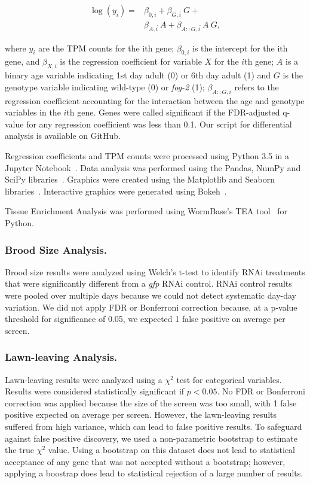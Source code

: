 \documentclass[10pt,letterpaper,twocolumn]{article}
\newcommand{\fog}{\emph{\mbox{fog-2}}}
\begin{document}
\begin{align*}
  \log(y_i) =& \beta_{0,i} + \beta_{G,i}\dot~G + \\
  &\beta_{A,i}\dot~A + \beta_{A::G,i}\dot~A~G,
  \label{eqn:GLM}
\end{align*}

where $y_i$ are the TPM counts for the ith gene; $\beta_{0,i}$ is the intercept for the ith gene, and $\beta_{X,i}$ is the regression coefficient for variable $X$ for the $i$th gene; $A$ is a binary age variable indicating 1st day adult (0) or 6th day adult (1) and $G$ is the genotype variable indicating wild-type (0) or \fog{} (1); $\beta_{A::G, i}$ refers to the regression coefficient accounting for the interaction between the age and genotype variables in the $i$th gene. Genes were called significant if the FDR-adjusted q-value for any regression coefficient was less than 0.1. Our script for differential analysis is available on GitHub.

Regression coefficients and TPM counts were processed using Python 3.5 in a Jupyter Notebook~\cite{Perez2007}. Data analysis was performed using the Pandas, NumPy and SciPy libraries~\cite{McKinney2011,VanDerWalt2011,Oliphant2007}. Graphics were created using the Matplotlib and Seaborn libraries~\cite{Waskom,Hunter2007}. Interactive graphics were generated using Bokeh~\cite{Team2014}.

Tissue Enrichment Analysis was performed using WormBase's TEA tool~\cite{Angeles-Albores2016} for Python.

\subsubsection*{Brood Size Analysis.}
Brood size results were analyzed using Welch's t-test to identify RNAi treatments that were significantly different from a \emph{gfp} RNAi control. RNAi control results were pooled over multiple days because we could not detect systematic day-day variation. We did not apply FDR or Bonferroni correction because, at a p-value threshold for significance of 0.05, we expected 1 false positive on average per screen.

\subsubsection*{Lawn-leaving Analysis.}
Lawn-leaving results were analyzed using a $\chi^2$ test for categorical variables. Results were considered statistically significant if $p<0.05$. No FDR or Bonferroni correction was applied because the size of the screen was too small, with 1 false positive expected on average per screen. However, the lawn-leaving results suffered from high variance, which can lead to false positive results.
To safeguard against false positive discovery, we used a non-parametric bootstrap to estimate the true $\chi^2$ value. Using a bootstrap on this dataset does not lead to statistical acceptance of any gene that was not accepted without a bootstrap; however, applying a boostrap does lead to statistical rejection of a large number of results.
\end{document}
